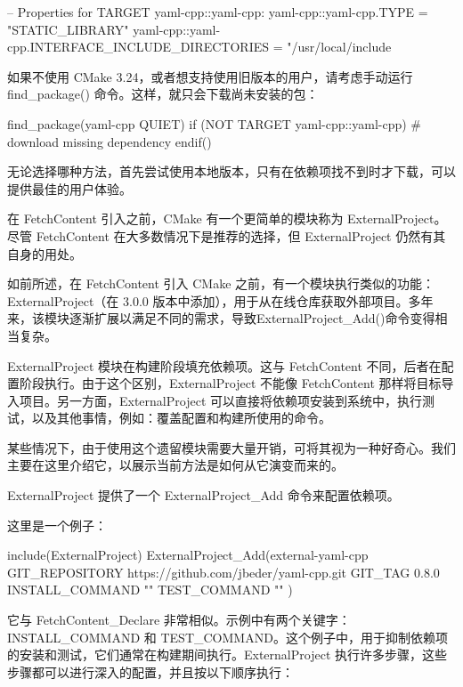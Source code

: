 \begin{shell}
--
    Properties for TARGET yaml-cpp::yaml-cpp:
        yaml-cpp::yaml-cpp.TYPE = "STATIC_LIBRARY"
        yaml-cpp::yaml-cpp.INTERFACE_INCLUDE_DIRECTORIES =
                                                    "/usr/local/include
\end{shell}

如果不使用 CMake 3.24，或者想支持使用旧版本的用户，请考虑手动运行 find\_package() 命令。这样，就只会下载尚未安装的包：

\begin{cmake}
find_package(yaml-cpp QUIET)
if (NOT TARGET yaml-cpp::yaml-cpp)
    # download missing dependency
endif()
\end{cmake}

无论选择哪种方法，首先尝试使用本地版本，只有在依赖项找不到时才下载，可以提供最佳的用户体验。

在 FetchContent 引入之前，CMake 有一个更简单的模块称为 ExternalProject。尽管 FetchContent 在大多数情况下是推荐的选择，但 ExternalProject 仍然有其自身的用处。


如前所述，在 FetchContent 引入 CMake 之前，有一个模块执行类似的功能：ExternalProject（在 3.0.0 版本中添加），用于从在线仓库获取外部项目。多年来，该模块逐渐扩展以满足不同的需求，导致ExternalProject\_Add()命令变得相当复杂。

ExternalProject 模块在构建阶段填充依赖项。这与 FetchContent 不同，后者在配置阶段执行。由于这个区别，ExternalProject 不能像 FetchContent 那样将目标导入项目。另一方面，ExternalProject 可以直接将依赖项安装到系统中，执行测试，以及其他事情，例如：覆盖配置和构建所使用的命令。

某些情况下，由于使用这个遗留模块需要大量开销，可将其视为一种好奇心。我们主要在这里介绍它，以展示当前方法是如何从它演变而来的。

ExternalProject 提供了一个 ExternalProject\_Add 命令来配置依赖项。

这里是一个例子：

\begin{cmake}
include(ExternalProject)
ExternalProject_Add(external-yaml-cpp
    GIT_REPOSITORY   https://github.com/jbeder/yaml-cpp.git
    GIT_TAG          0.8.0
    INSTALL_COMMAND  ""
    TEST_COMMAND     ""
)
\end{cmake}

它与 FetchContent\_Declare 非常相似。示例中有两个关键字：INSTALL\_COMMAND 和 TEST\_COMMAND。这个例子中，用于抑制依赖项的安装和测试，它们通常在构建期间执行。ExternalProject 执行许多步骤，这些步骤都可以进行深入的配置，并且按以下顺序执行：

